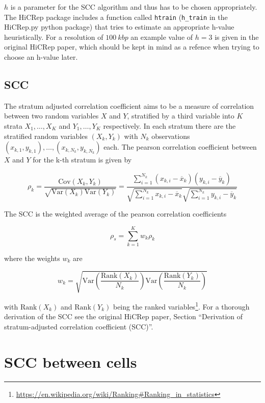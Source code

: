 \(h\) is a parameter for the SCC algorithm and thus has to be chosen appropriately. The HiCRep package includes a function called \verb|htrain| (\verb|h_train| in the HiCRep.py python package) that tries to estimate an appropriate h-value heuristically. For a resolution of \(\SI{100}{kbp}\) an example value of \( h = 3 \) is given in the original HiCRep paper, which should be kept in mind as a refence when trying to choose an h-value later.


\subsection{SCC} %
\label{subsec:scc}

The stratum adjusted correlation coefficient aims to be a measure of correlation between two random variables \(X\) and \(Y\), stratified by a third variable into \(K\) strata \(X_1, \dots, X_K\) and \(Y_1, \dots, Y_K\) respectively. In each stratum there are the stratified random variables \((X_k, Y_k)\) with \(N_k\) observations \( (x_{k,1}, y_{k,1}), \dots, (x_{k,N_k}, y_{k,N_k}) \) each. The pearson correlation coefficient between \(X\) and \(Y\) for the k-th stratum is given by

\[
  \rho_k = \frac{ \mathrm{Cov}(X_k,Y_k) }{ \sqrt{ \mathrm{Var}(X_k) \mathrm{Var}(Y_k)} } = \frac{ \sum_{i=1}^{N_k} (x_{k,i} - \overbar{x}_k) (y_{k,i} - \overbar{y}_k) }{ \sqrt{ \sum_{i=1}^{N_k} x_{k,i} - \overbar{x}_k } \sqrt{ \sum_{i=1}^{N_k} y_{k,i} - \overbar{y}_k } }
\]

The SCC is the weighted average of the pearson correlation coefficients

\[
  \rho_s = \sum_{k=1}^{K} w_k \rho_k
\]

where the weights \(w_k\) are

\[
  w_k = \sqrt{ \mathrm{Var}\left( \frac{ \mathrm{Rank}(X_k) }{ N_k } \right) \mathrm{Var}\left( \frac{ \mathrm{Rank}(Y_k) }{ N_k } \right) }
\]

with \( \mathrm{Rank}(X_k) \) and \( \mathrm{Rank}(Y_k) \) being the ranked variables\footnote{\url{https://en.wikipedia.org/wiki/Ranking\#Ranking_in_statistics}}. For a thorough derivation of the SCC see the original HiCRep paper\cite{yang_hicrep_2017}, Section \enquote{Derivation of stratum-adjusted correlation coefficient (SCC)}.


\section{SCC between cells} %
\label{sec:scc_between_cells}

